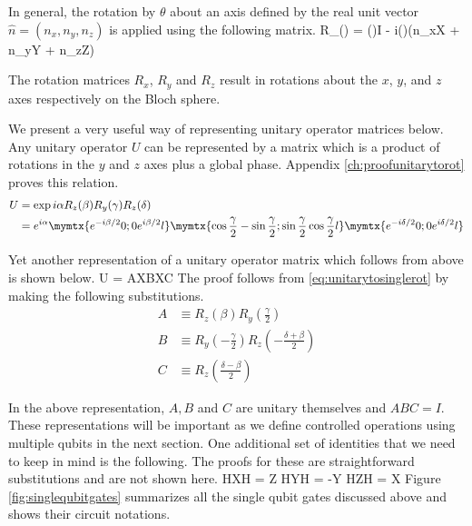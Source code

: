 In general, the rotation by $\theta$ about an axis defined by the real unit vector $\hat{n} = (n_x,n_y,n_z)$ is applied using the following matrix.
\beq
R_{}(\theta) \equiv {} = \cos\left(\right)I - i\sin\left(\right)(n_xX + n_yY + n_zZ)
\eeq

The rotation matrices $R_x$, $R_y$ and $R_z$ result in rotations about the $x$, $y$, and $z$ axes respectively on the Bloch sphere. 

We present a very useful way of representing unitary operator matrices below. Any unitary operator $U$ can be represented by a matrix which is a product of rotations in the $y$ and $z$ axes plus a global phase. Appendix \ref{ch:proofunitarytorot} proves this relation.
\begin{align}
\label{eq:unitarytosinglerot}
U &= \exp{i\alpha}R_z(\beta)R_y(\gamma)R_z(\delta)\\ 
&= e^{i\alpha}\mymtx{e^{-i\beta/2} 0 ; 0 e^{i\beta/2}l}
\mymtx{\cos\frac{\gamma}{2} -\sin\frac{\gamma}{2} ; \sin\frac{\gamma}{2} \cos\frac{\gamma}{2}l} 
\mymtx{e^{-i\delta/2} 0 ; 0 e^{i\delta/2}l}
\end{align}

Yet another representation of a unitary operator matrix which follows from above is shown below.
\beq
U = AXBXC
\label{eq:unitarytosingle}
\eeq
The proof follows from \eqref{eq:unitarytosinglerot} by making the following substitutions.
\begin{align}
A &\equiv R_z\left(\beta\right)R_y\left(\frac{\gamma}{2}\right)\\
B &\equiv R_y\left(-\frac{\gamma}{2}\right)R_z\left(-\frac{\delta + \beta}{2}\right)\\
C &\equiv R_z\left(\frac{\delta - \beta}{2}\right)
\end{align}

In the above representation, $A,B$ and $C$ are unitary themselves and $ABC = I$.
These representations will be important as we define controlled operations using multiple qubits in the next section. One additional set of identities that we need to keep in mind is the following. The proofs for these are straightforward substitutions and are not shown here.
\beq
HXH = Z \text{ ; } HYH = -Y \text{ ; } HZH = X
\eeq
Figure \ref{fig:singlequbitgates} summarizes all the single qubit gates discussed above and shows their circuit notations.


